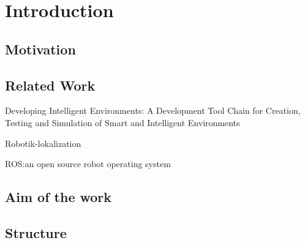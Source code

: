 \chapter{Introduction}\label{ch:introduction}

\section{Motivation}\label{sec:motivation}
\section{Related Work}\label{sec:related-work}
Developing Intelligent Environments: A Development Tool Chain for Creation, Testing and Simulation of Smart and Intelligent Environments\cite{roalter2011developing}

Robotik-lokalization\cite{MooreStouchKeneralizedEkf2014}

ROS:\@ an open source robot operating system\cite{Quigley2009ROSAO}

\section{Aim of the work}\label{sec:aimOfTheWork}
\section{Structure}\label{sec:structure}

